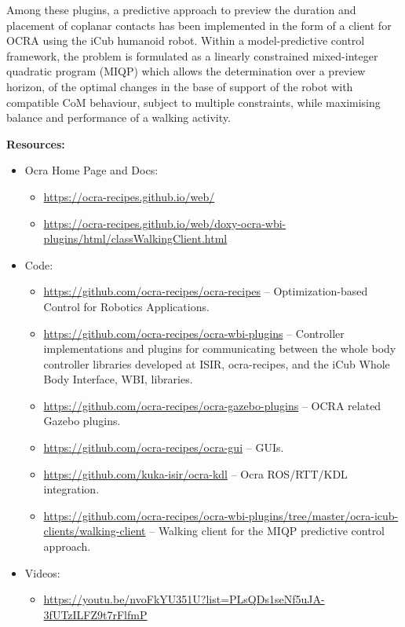 Among these plugins, a predictive approach \cite{ibanez2015Emergence} to
preview the duration and placement of coplanar contacts has been implemented
in the form of a client for OCRA using the iCub humanoid robot.  Within a
model-predictive control framework, the problem is formulated as a linearly
constrained mixed-integer quadratic program (MIQP) which allows the
determination over a preview horizon, of the optimal changes in the base of
support of the robot with compatible CoM behaviour, subject to multiple
constraints, while maximising balance and performance of a walking activity.

\textbf{Resources:}
\begin{itemize}
\item Ocra Home Page and Docs:
\begin{itemize}
\item \url{https://ocra-recipes.github.io/web/}
\item \url{https://ocra-recipes.github.io/web/doxy-ocra-wbi-plugins/html/classWalkingClient.html}
\end{itemize}
\item Code:
\begin{itemize}
\item \url{https://github.com/ocra-recipes/ocra-recipes} -- Optimization-based Control for Robotics Applications.
\item \url{https://github.com/ocra-recipes/ocra-wbi-plugins} -- Controller implementations and plugins for communicating between the whole body controller libraries developed at ISIR, ocra-recipes, and the iCub Whole Body Interface, WBI, libraries.
\item \url{https://github.com/ocra-recipes/ocra-gazebo-plugins} -- OCRA related Gazebo plugins.
\item \url{https://github.com/ocra-recipes/ocra-gui} -- GUIs.
\item \url{https://github.com/kuka-isir/ocra-kdl} -- Ocra ROS/RTT/KDL integration.
\item \url{https://github.com/ocra-recipes/ocra-wbi-plugins/tree/master/ocra-icub-clients/walking-client} -- Walking client for the MIQP predictive control approach.
\end{itemize}
\item Videos:
\begin{itemize}
\item \url{https://youtu.be/nvoFkYU351U?list=PLsQDs1seNf5uJA-3fUTzILFZ9t7rFlfmP}
\end{itemize}
\end{itemize}

